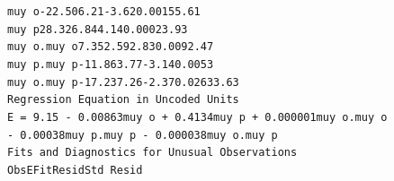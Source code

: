\documentclass[12pt,a4paper]{article}
\newcommand{\code}[1]{\texttt{#1}}
\begin{document}
\code{muy o}\hspace*{2.3cm}\code{-22.50}\hspace*{1.7cm}\code{6.21}\hspace*{1.45cm}\code{-3.62}\hspace*{1.4cm}\code{0.001}\hspace*{0.5cm}\code{55.61}\\
\code{muy p}\hspace*{2.55cm}\code{28.32}\hspace*{1.7cm}\code{6.84}\hspace*{1.7cm}\code{4.14}\hspace*{1.4cm}\code{0.000}\hspace*{0.5cm}\code{23.93}\\
\code{muy o.muy o}\hspace*{1.3cm}\code{7.35}\hspace*{1.7cm}\code{2.59}\hspace*{1.7cm}\code{2.83}\hspace*{1.4cm}\code{0.009}\hspace*{0.75cm}\code{2.47}\\
\code{muy p.muy p}\hspace*{0.8cm}\code{-11.86}\hspace*{1.7cm}\code{3.77}\hspace*{1.45cm}\code{-3.14}\hspace*{1.4cm}\code{0.005}\hspace*{1.5cm}\code{3}\\
\code{muy o.muy p}\hspace*{0.8cm}\code{-17.23}\hspace*{1.7cm}\code{7.26}\hspace*{1.45cm}\code{-2.37}\hspace*{1.4cm}\code{0.026}\hspace*{0.5cm}\code{33.63}\\
\newline
\code{Regression Equation in Uncoded Units}\\
\newline
\code{E = 9.15 - 0.00863muy o + 0.4134muy p + 0.000001muy o.muy o \\ \hspace*{4cm}- 0.00038muy p.muy p - 0.000038muy o.muy p}\\
\newline
\code{Fits and Diagnostics for Unusual Observations}\\
\newline
\code{Obs}\hspace*{2cm}\code{E}\hspace*{1.5cm}\code{Fit}\hspace*{1.5cm}\code{Resid}\hspace*{1.5cm}\code{Std Resid}\\
\end{document}
